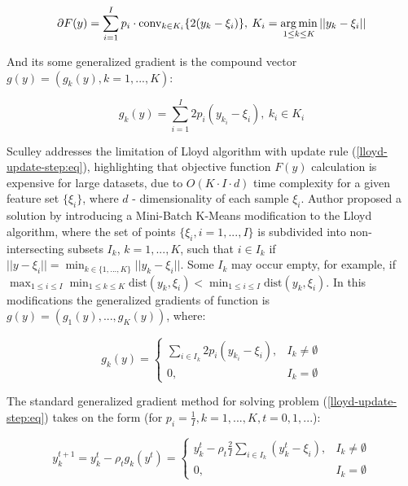 \begin{equation}
    \label{lloyd-grad-set:eq}
        \partial F(y) = \sum_{i=1}^I p_i \cdot \text{conv}_{k \in K_i} \{ 2 (y_k - \xi_i) \}, \> K_i = \operatorname*{arg\,min}_{1 \leq k \leq K} || y_k - \xi_i ||
\end{equation}

And its some generalized gradient is the compound vector $ g(y) = (g_k(y), k = 1, ..., K) $:

\begin{equation}
    \label{lloyd-compound-grad:eq}
        g_k(y) = \sum_{i=1}^I 2 p_i (y_{k_i} - \xi_i), \> k_i \in K_i
\end{equation}

Sculley \cite{Sculley_2010} addresses the limitation of Lloyd algorithm with update rule (\ref{lloyd-update-step:eq}), highlighting that objective function $ F(y) $ calculation is expensive for large datasets, due to $ O(K \cdot I \cdot d) $ time complexity for a given feature set $ \{ \xi_i \} $, where $ d $ - dimensionality of each sample $ \xi_i $. Author proposed a solution by introducing a Mini-Batch K-Means modification to the Lloyd algorithm, where the set of points $ \{ \xi_i, i = 1, ..., I \} $ is subdivided into non-intersecting subsets $ I_k $, $ k = 1, ..., K $,  such that $ i \in I_k $ if $ || y - \xi_i || = \min_{k \in \{ 1, ..., K \}} || y_k - \xi_i || $.  Some $ I_k $ may occur empty, for example, if $ \max_{1 \leq i \leq I} \min_{1 \leq k \leq K} \text{dist} (y_k, \xi_i) < \min_{1 \leq i \leq I} \text{dist} (y_k, \xi_i) $. In this modifications the generalized gradients of function is $ g(y) = (g_1(y), ..., g_K(y)) $, where:

\begin{equation}
    \label{lloyd-gen-grad-component:eq}
    g_k(y) = \begin{cases}
        \sum_{i \in I_k} 2 p_i (y_{k_i} - \xi_i), & I_k \neq \emptyset \\
        0, & I_k = \emptyset 
    \end{cases}
\end{equation}

The standard generalized gradient method for solving problem (\ref{lloyd-update-step:eq}) takes on the form (for $ p_i = \frac{1}{I}, k = 1, ..., K, t = 0, 1, ... $):

\begin{equation}
    \label{lloyd-gen-grad:eq}
    y_k^{t+1} = y_k^t - \rho_t g_k(y^t) = \begin{cases}
        y_k^t - \rho_t \frac{2}{I} \sum_{i \in I_k} (y_k^t - \xi_i), & I_k \neq \emptyset \\
        0, & I_k = \emptyset
    \end{cases}
\end{equation}


